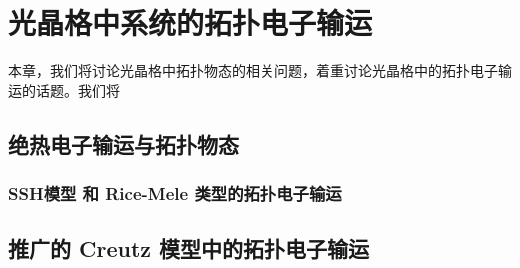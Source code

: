 \chapter{光晶格中系统的拓扑电子输运}

本章，我们将讨论光晶格中拓扑物态的相关问题，着重讨论光晶格中的拓扑电子输运的话题。我们将



\section{绝热电子输运与拓扑物态}\label{sec:topocp}




\subsection{SSH模型 和 Rice-Mele 类型的拓扑电子输运}\label{sec:ssh}




\section{推广的 Creutz 模型中的拓扑电子输运}\label{sec:creutz}
